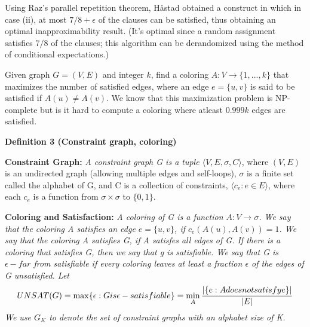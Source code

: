 Using Raz's parallel repetition theorem, Håstad obtained a construct in which in case (ii), at most $7/8+\epsilon$ of the clauses can be satisfied, thus obtaining an optimal inapproximability result. (It's optimal since a random assignment satisfies $7/8$ of the clauses; this algorithm can be derandomized using the method of conditional expectations.)

Given graph $G = (V,E)$ and integer $k$, find a coloring $A : V \rightarrow \{1,...,k\}$ that maximizes the number of satisfied edges, where an edge $e = \{u,v\}$ is said to be satisfied if $A(u) \neq A(v)$. We know that this maximization problem is NP-complete but is it hard to compute a coloring where atleast $0.999k$ edges are satisfied.

\textbf{Definition 3 (Constraint graph, coloring)}

\textbf{Constraint Graph:} \textit{A constraint graph G is a tuple $\langle V, E, \sigma, C \rangle$}, where $(V,E)$ is an undirected graph (allowing multiple edges and self-loops), $\sigma$ is a finite set called the alphabet of G, and C is a collection of constraints, $\langle c_e : e \in E \rangle$, where each $c_e$ is a function from $\sigma \times \sigma$ to $\{0,1\}$.

\textbf{Coloring and Satisfaction:} \textit{A coloring of G is a function $A : V \rightarrow \sigma$. We say that the coloring A satisfies an edge $e = \{u,v\}$, if $c_e(A(u),A(v)) = 1$. We say that the coloring A satisfies G, if A satisfes all edges of G. If there is a coloring that satisfies G, then we say that g is satisfiable. We say that G is $\epsilon-far$ from satisfiable if every coloring leaves at least a fraction $\epsilon$ of the edges of G unsatisfied. Let $$UNSAT(G) = \max \{\epsilon : G is \epsilon -satisfiable\} = \min_A \frac{\arrowvert\{e : A does not satisfy e\}\arrowvert}{\arrowvert E \arrowvert}$$ We use $G_K$ to denote the set of constraint graphs with an alphabet size of K.}

